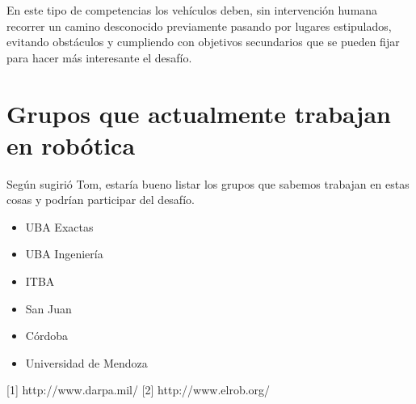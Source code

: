 \documentclass[a4paper,12pt]{article}
\begin{document}
En este tipo de competencias los vehículos deben, sin intervención humana recorrer un camino desconocido previamente pasando por lugares estipulados, evitando obstáculos y cumpliendo con objetivos secundarios que se pueden fijar para hacer más interesante el desafío.

\section{Grupos que actualmente trabajan en robótica}

Según sugirió Tom, estaría bueno listar los grupos que sabemos trabajan en estas cosas y podrían participar del desafío.

\begin{itemize}
 \item UBA Exactas
 \item UBA Ingeniería
 \item ITBA
 \item San Juan
 \item Córdoba
 \item Universidad de Mendoza
\end{itemize}



[1] http://www.darpa.mil/
[2] http://www.elrob.org/
\end{document}
